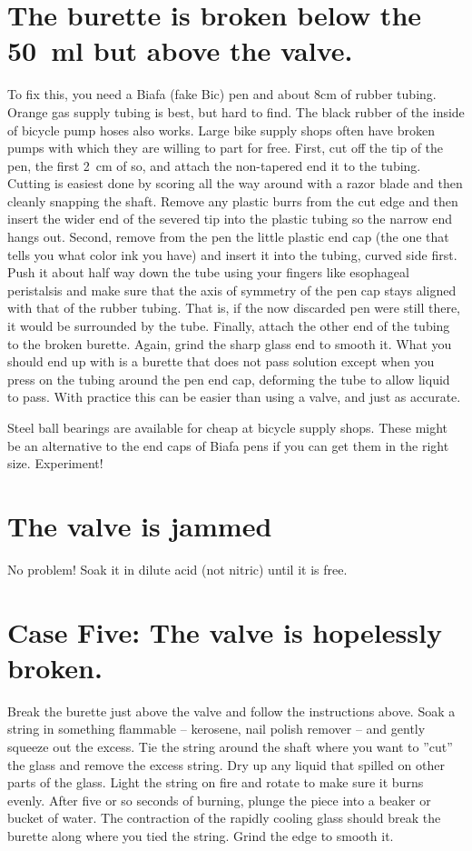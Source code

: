 \section{The burette is broken below the 50~ml but above the valve.}
To fix this, 
you need a Biafa (fake Bic) pen and about 8cm of rubber tubing. 
Orange gas supply tubing is best, 
but hard to find. 
The black rubber of the inside of bicycle pump hoses also works. 
Large bike supply shops often have broken pumps 
with which they are willing to part for free. 
First, 
cut off the tip of the pen, 
the first 2~cm of so, 
and attach the non-tapered end it to the tubing. 
Cutting is easiest done by scoring all the way around 
with a razor blade and then cleanly snapping the shaft. 
Remove any plastic burrs from the cut edge 
and then insert the wider end of the severed tip 
into the plastic tubing so the narrow end hangs out. 
Second, 
remove from the pen the little plastic end cap 
(the one that tells you what color ink you have) 
and insert it into the tubing, 
curved side first. 
Push it about half way down the tube using your 
fingers like esophageal peristalsis and make sure that 
the axis of symmetry of the pen cap stays aligned 
with that of the rubber tubing. 
That is, 
if the now discarded pen were still there, 
it would be surrounded by the tube. 
Finally, 
attach the other end of the tubing to the broken burette. 
Again, 
grind the sharp glass end to smooth it. 
What you should end up with is a burette that does not pass solution 
except when you press on the tubing around the pen end cap, 
deforming the tube to allow liquid to pass. 
With practice this can be easier than using a valve, 
and just as accurate.

Steel ball bearings are available for cheap at bicycle supply shops. 
These might be an alternative to the end caps of Biafa pens 
if you can get them in the right size. 
Experiment!

\section{The valve is jammed}
No problem! Soak it in dilute acid (not nitric) until it is free.

\section{Case Five: The valve is hopelessly broken.}
Break the burette just above the valve and follow the instructions above. 
Soak a string in something flammable -- kerosene, 
nail polish remover -- and gently squeeze out the excess. 
Tie the string around the shaft where 
you want to ''cut'' the glass and remove the excess string. 
Dry up any liquid that spilled on other parts of the glass. 
Light the string on fire and rotate to make sure it burns evenly. 
After five or so seconds of burning, 
plunge the piece into a beaker or bucket of water. 
The contraction of the rapidly cooling glass 
should break the burette along where you tied the string. 
Grind the edge to smooth it.

